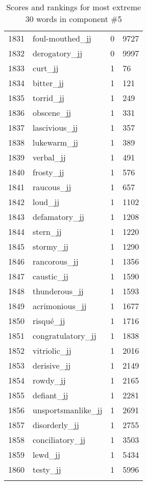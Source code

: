 \begin{longtable}[!htbp]{| rlr@{.}l |}
    1831 & foul-mouthed\_jj & 0 & 9727 \\
    1832 & derogatory\_jj & 0 & 9997 \\
    1833 & curt\_jj & 1 & 76 \\
    1834 & bitter\_jj & 1 & 121 \\
    1835 & torrid\_jj & 1 & 249 \\
    1836 & obscene\_jj & 1 & 331 \\
    1837 & lascivious\_jj & 1 & 357 \\
    1838 & lukewarm\_jj & 1 & 389 \\
    1839 & verbal\_jj & 1 & 491 \\
    1840 & frosty\_jj & 1 & 576 \\
    1841 & raucous\_jj & 1 & 657 \\
    1842 & loud\_jj & 1 & 1102 \\
    1843 & defamatory\_jj & 1 & 1208 \\
    1844 & stern\_jj & 1 & 1220 \\
    1845 & stormy\_jj & 1 & 1290 \\
    1846 & rancorous\_jj & 1 & 1356 \\
    1847 & caustic\_jj & 1 & 1590 \\
    1848 & thunderous\_jj & 1 & 1593 \\
    1849 & acrimonious\_jj & 1 & 1677 \\
    1850 & risqué\_jj & 1 & 1716 \\
    1851 & congratulatory\_jj & 1 & 1838 \\
    1852 & vitriolic\_jj & 1 & 2016 \\
    1853 & derisive\_jj & 1 & 2149 \\
    1854 & rowdy\_jj & 1 & 2165 \\
    1855 & defiant\_jj & 1 & 2281 \\
    1856 & unsportsmanlike\_jj & 1 & 2691 \\
    1857 & disorderly\_jj & 1 & 2755 \\
    1858 & conciliatory\_jj & 1 & 3503 \\
    1859 & lewd\_jj & 1 & 5434 \\
    1860 & testy\_jj & 1 & 5996 \\
    \hline
    \caption{Scores and rankings for most extreme 30 words in component \#5} \\
\end{longtable}
